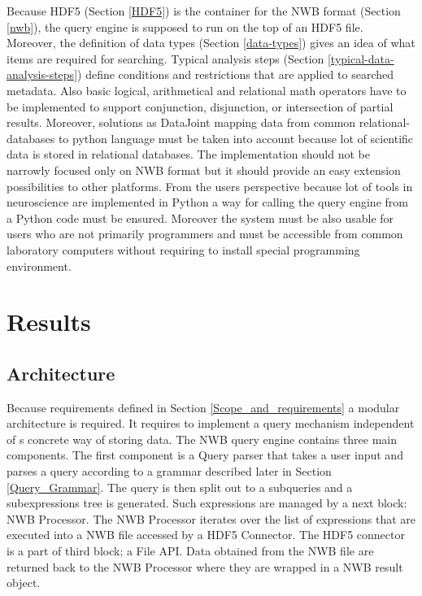 \documentclass[utf8]{frontiersSCNS} %
\begin{document}
Because HDF5 (Section \ref{HDF5}) is the container for the NWB format (Section \ref{nwb}), the query engine is supposed to run on the top of an HDF5 file. Moreover, the definition of data types (Section \ref{data-types}) gives an idea of what items are required for searching. Typical analysis steps (Section \ref{typical-data-analysis-steps}) define conditions and restrictions that are applied to searched metadata. Also basic logical, arithmetical and relational math operators have to be implemented to support conjunction, disjunction, or intersection of partial results. Moreover, solutions as DataJoint mapping data from common relational-databases to python language must be taken into account because lot of scientific data is stored in relational databases. The implementation should not be narrowly focused only on NWB format but it should provide an easy extension possibilities to other platforms. From the users perspective because lot of tools in neuroscience are implemented in Python a way for calling the query engine from a Python code must be ensured. Moreover the system must be also usable for users who are not primarily programmers and must be accessible from common laboratory computers without requiring to install special programming environment.

\section{Results}
\label{results}


\subsection{Architecture}
\label{Architecture}

Because requirements defined in Section \ref{Scope_and_requirements} a modular architecture is required. It requires to implement a query mechanism independent of s concrete way of storing data. The NWB query engine contains three main components. The first component is a Query parser that takes a user input and parses a query according to a grammar described later in Section \ref{Query_Grammar}. The query is then split out to a subqueries and a subexpressions tree is generated. Such expressions are managed by a next block: NWB Processor. The NWB Processor iterates over the list of expressions that are executed into a NWB file accessed by a HDF5 Connector. The HDF5 connector is a part of third block; a File API. Data obtained from the NWB file are returned back to the NWB Processor where they are wrapped in a NWB result object. 
\end{document}
